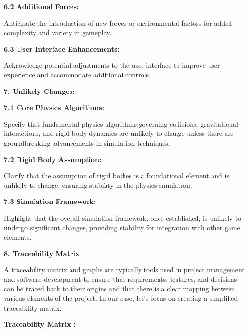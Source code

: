 \documentclass[
]{article}
\begin{document}
\textbf{6.2 Additional Forces:}

Anticipate the introduction of new forces or environmental factors for
added complexity and variety in gameplay.

\textbf{6.3 User Interface Enhancements:}

Acknowledge potential adjustments to the user interface to improve user
experience and accommodate additional controls.

\protect\hypertarget{qm}{}{}\textbf{7. Unlikely Changes:}

\textbf{7.1 Core Physics Algorithms:}

Specify that fundamental physics algorithms governing collisions,
gravitational interactions, and rigid body dynamics are unlikely to
change unless there are groundbreaking advancements in simulation
techniques.

\textbf{7.2 Rigid Body Assumption:}

Clarify that the assumption of rigid bodies is a foundational element
and is unlikely to change, ensuring stability in the physics simulation.

\textbf{7.3 Simulation Framework:}

Highlight that the overall simulation framework, once established, is
unlikely to undergo significant changes, providing stability for
integration with other game
elements.\protect\hypertarget{_Hlk157473991}{}{}

\textbf{8. Traceability Matrix}

A traceability matrix and graphs are typically tools used in project
management and software development to ensure that requirements,
features, and decisions can be traced back to their origins and that
there is a clear mapping between various elements of the project. In our
case, let's focus on creating a simplified traceability matrix.

\textbf{Traceability Matrix :}
\end{document}
